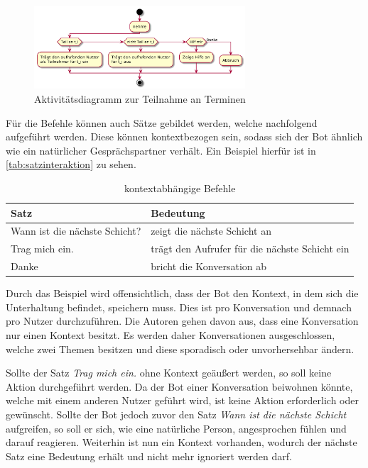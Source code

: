\begin{figure}[htbp]
    \centering
    \includegraphics[width=0.7\textwidth]{../docs/uml/activity-teilnahme.png}
    \caption{Aktivitätsdiagramm zur Teilnahme an Terminen}
    \label{img:activity-teilnahme}
\end{figure}


Für die Befehle können auch Sätze gebildet werden, welche nachfolgend aufgeführt werden. Diese können kontextbezogen sein, sodass sich der Bot ähnlich wie ein natürlicher Gesprächspartner verhält. Ein Beispiel hierfür ist in \autoref{tab:satzinteraktion} zu sehen.

\begin{table}[H]
\centering
\begin{tabular}{|l|l|}
\hline
\textbf{Satz} & \textbf{Bedeutung }\\
 \hline
Wann ist die nächste Schicht? & zeigt die nächste Schicht an \\
\hline
Trag mich ein. & trägt den Aufrufer für die nächste Schicht ein \\
\hline
Danke & bricht die Konversation ab \\
\hline
\end{tabular}
\caption{kontextabhängige Befehle}
\label{tab:satzinteraktion}
\end{table}

Durch das Beispiel wird offensichtlich, dass der Bot den Kontext, in dem sich die Unterhaltung befindet, speichern muss. Dies ist pro Konversation und demnach pro Nutzer durchzuführen. Die Autoren gehen davon aus, dass eine Konversation nur einen Kontext besitzt. Es werden daher Konversationen ausgeschlossen, welche zwei Themen besitzen und diese sporadisch oder unvorhersehbar ändern.

Sollte der Satz \textit{Trag mich ein.} ohne Kontext geäußert werden, so soll keine Aktion durchgeführt werden. Da der Bot einer Konversation beiwohnen könnte, welche mit einem anderen Nutzer geführt wird, ist keine Aktion erforderlich oder gewünscht. Sollte der Bot jedoch zuvor den Satz \textit{Wann ist die nächste Schicht} aufgreifen, so soll er sich, wie eine natürliche Person, angesprochen fühlen und darauf reagieren. Weiterhin ist nun ein Kontext vorhanden, wodurch der nächste Satz eine Bedeutung erhält und nicht mehr ignoriert werden darf.

